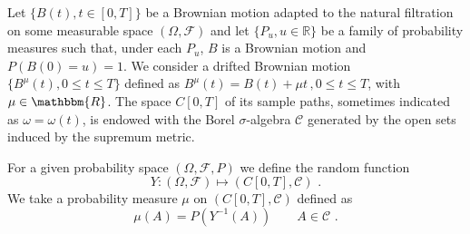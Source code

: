 %
%
%
Let $ \{ B(t),  t \in [0,T] \}$ be a Brownian motion adapted to the natural filtration on some measurable space $ (\Omega, \mathscr F) $
and let $ \{ P_u , u \in \mathbb R \} $ be a family of probability measures such that, under each $ P_u $, $ B $ is a Brownian motion and $  P(B(0) = u) = 1$. 
We consider a drifted Brownian motion $ \{ B^\mu (t), 0 \leq t \leq T\}  $ 
defined as $ B^\mu ( t) = B(t) + \mu t \, , 0 \leq t \leq T  $, 
with $ \mu \in \mathbbm{R} $.
The space $ C[0,T] $ of its sample paths, sometimes indicated as $ \omega = \omega(t) $,
is endowed with the Borel $ \sigma $-algebra $ \mathscr C $ generated by the open sets induced 
by the supremum metric. 

For a given probability space $ (\Omega, \mathscr F, P) $
we define the random function 
\begin{equation}\label{eq:rand-fun}
Y: (\Omega, \mathscr F) \mapsto (C[0,T], \mathscr C) \,\, .
 \end{equation}
%
%
We take a probability measure $ \mu $ on $ (C[0,T], \mathscr C) $ defined as
%
%
\begin{equation}
\mu(A) = P(Y^{-1} ( A)) \qquad A \in \mathscr C \,\, .
\end{equation}
%
%

